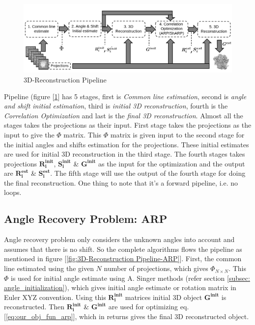 \documentclass{report}
\begin{document}
\begin{figure}[H]
\includegraphics[width=1\textwidth]{3d-reconstrction-pipepline.png}
\centering
\captionsetup{justification=centering}
\caption{3D-Reconstruction Pipeline }
\label{fig:3D-Reconstruction Pipeline}
\end{figure}

Pipeline (figure [\ref{fig:3D-Reconstruction Pipeline}] has 5 stages, first is  \textit{Common line estimation}, second is  \textit{angle and shift initial estimation}, third is \textit{initial 3D reconstruction}, fourth is the \textit{Correlation Optimization} and  last is the \textit{final 3D reconstruction}. Almost all the stages takes the projections as their input. First stage takes the projections as the input to give the $\Phi$ matrix. This $\Phi$ matrix is given input to the second stage for the initial angles and shifts estimation for the projections. These initial estimates are used for initial 3D reconstruction in the third stage. The fourth stages takes projections $\boldsymbol{R_i^{init}}$, $\boldsymbol{S_i^{init}}$ \& $\boldsymbol{G^{init}}$ as the input for the optimization and the output are $\boldsymbol{R_i^{est}}$ \& $\boldsymbol{S_i^{est}}$. The fifth stage will use the output of the fourth stage for doing the final reconstruction. One thing to note that it's a forward pipeline, i.e. no loops.

\subsection{Angle Recovery Problem: ARP} \label{subsec:ARP-EXP}

Angle recovery problem only considers the unknown angles into account and assumes that there is no shift. So the complete algorithms flows the pipeline as mentioned in figure [\ref{fig:3D-Reconstruction Pipeline-ARP}]. First, the common line estimated using the given $N$ number of projections, which gives $\Phi_{N\times N}$. This $\Phi$ is used for initial angle estimate using A. Singer methods (refer section \ref{subsec: angle_initialization}), which gives initial angle estimate or rotation matrix in Euler XYZ convention. Using this $\boldsymbol{R_i^{init}}$ matrices initial 3D object $\boldsymbol{G^{init}}$ is reconstructed. Then $\boldsymbol{R_i^{init}}$ \& $\boldsymbol{G^{init}}$ are used for optimizing eq. [\ref{eq:our_obj_fun_arp}], which in returns gives the final 3D reconstructed object.
\end{document}

